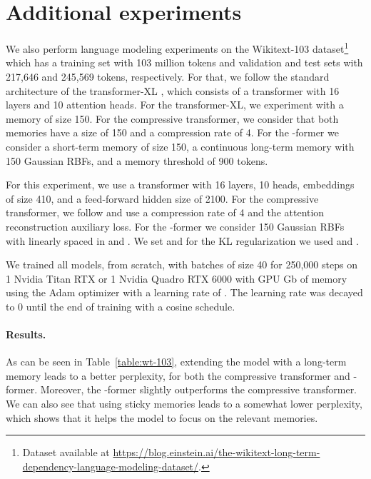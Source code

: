\documentclass[11pt]{article}
\begin{document}
\section{Additional experiments}
\label{sec:lm}
We also perform language modeling experiments on the Wikitext-103 dataset\footnote{Dataset available at \href{https://blog.einstein.ai/the-wikitext-long-term-dependency-language-modeling-dataset/}{https://blog.einstein.ai/the-wikitext-long-term-dependency-language-modeling-dataset/}.} \citep{merity2016pointer} which has a training set with 103 million tokens and validation and test sets with  217,646 and 245,569 tokens, respectively. 
For that, we follow the standard architecture of the transformer-XL \citep{dai2019transformer}, which consists of a transformer with 16 layers and 10 attention heads. For the transformer-XL, we experiment with a memory of size 150. For the compressive transformer, we consider that both memories have a size of 150 and a compression rate of 4. 
For the \mbox{-former} we consider a short-term memory of size 150, a continuous long-term memory with 150 Gaussian RBFs, and a memory threshold of 900 tokens. 

For this experiment, we use a transformer with 16 layers, 10 heads, embeddings of size 410, and  a feed-forward hidden size of 2100. For the compressive transformer, we follow \citet{rae2019compressive} and use a compression rate of 4 and the attention reconstruction auxiliary loss.  For the -former we consider 150 Gaussian RBFs  with  linearly spaced in  and . 
We set  and for the KL regularization we used  and .

We trained all models, from scratch, with batches of size 40 for 250,000 steps on 1 Nvidia Titan RTX or 1 Nvidia Quadro RTX 6000 with  GPU Gb of memory using the Adam optimizer \citep{kingma2015adam} with a learning rate of . The learning rate was decayed to 0 until the end of training with a cosine schedule.

\paragraph{Results. }
As can be seen in Table~\ref{table:wt-103}, extending the model with a long-term memory leads to a better perplexity, for both the compressive transformer and  -former. 
Moreover, the -former slightly outperforms the compressive transformer. We can also see that using sticky memories leads to a somewhat lower perplexity, which shows that it helps the model to focus on the relevant memories.
\end{document}

